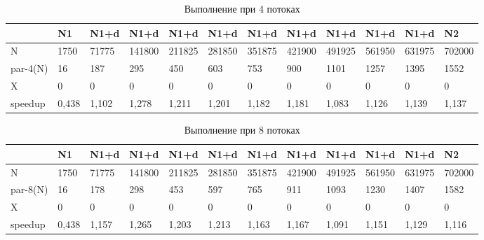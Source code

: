 \documentclass[a4paper,14pt,russian]{extarticle}
\begin{document}
\begin{table}[H]
	\caption{Выполнение при 4 потоках}
	\label{icc-4}
	\begin{adjustbox}{width=\textwidth,nofloat=table}
		\begin{tabular}{|l|l|l|l|l|l|l|l|l|l|l|l|}
			\hline
			& N1    & N1+d  & N1+d   & N1+d   & N1+d   & N1+d   & N1+d   & N1+d   & N1+d   & N1+d   & N2     \\ \hline
N        & 1750  & 71775 & 141800 & 211825 & 281850 & 351875 & 421900 & 491925 & 561950 & 631975 & 702000 \\ \hline
par-4(N) & 16    & 187   & 295    & 450    & 603    & 753    & 900    & 1101   & 1257   & 1395   & 1552   \\ \hline
X        & 0     & 0     & 0      & 0      & 0      & 0      & 0      & 0      & 0      & 0      & 0      \\ \hline
speedup  & 0,438 & 1,102 & 1,278  & 1,211  & 1,201  & 1,182  & 1,181  & 1,083  & 1,126  & 1,139  & 1,137  \\ \hline
		\end{tabular}
	\end{adjustbox}
\end{table}

\begin{table}[H]
	\caption{Выполнение при 8 потоках}
	\label{icc-8}
	\begin{adjustbox}{width=\textwidth,nofloat=table}
		\begin{tabular}{|l|l|l|l|l|l|l|l|l|l|l|l|}
			\hline
			& N1   & N1+d  & N1+d   & N1+d   & N1+d   & N1+d   & N1+d   & N1+d   & N1+d   & N1+d   & N2     \\ \hline
N        & 1750  & 71775 & 141800 & 211825 & 281850 & 351875 & 421900 & 491925 & 561950 & 631975 & 702000 \\ \hline
par-8(N) & 16    & 178   & 298    & 453    & 597    & 765    & 911    & 1093   & 1230   & 1407   & 1582   \\ \hline
X        & 0     & 0     & 0      & 0      & 0      & 0      & 0      & 0      & 0      & 0      & 0      \\ \hline
speedup  & 0,438 & 1,157 & 1,265  & 1,203  & 1,213  & 1,163  & 1,167  & 1,091  & 1,151  & 1,129  & 1,116  \\ \hline
		\end{tabular}
	\end{adjustbox}
\end{table}
\end{document}
